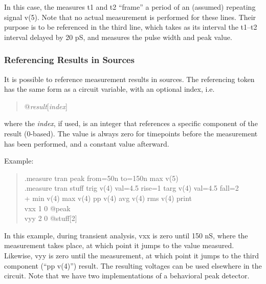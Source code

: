 In this case, the measures {\vt t1} and {\vt t2} ``frame'' a period
of an (assumed) repeating signal v(5).  Note that no actual
measurement is performed for these lines.  Their purpose is to be
referenced in the third line, which takes as its interval the {\vt
t1}--{\vt t2} interval delayed by 20 pS, and measures the pulse
width and peak value.

\subsubsection{Referencing Results in Sources}

It is possible to reference measurement results in sources.  The
referencing token has the same form as a circuit variable, with an
optional index, i.e.
\begin{quote}\vt
    @{\it result\/}[{\it index\/}]
\end{quote}
where the {\it index\/}, if used, is an integer that references a
specific component of the result (0-based).  The value is always zero
for timepoints before the measurement has been performed, and a
constant value afterward.

Example:
\begin{quote}\vt
    .measure tran peak from=50n to=150n max v(5)\\
    .measure tran stuff trig v(4) val=4.5 rise=1 targ v(4) val=4.5 fall=2\\
    + min v(4) max v(4) pp v(4) avg v(4) rms v(4) print\\
    vxx 1 0 @peak\\
    vyy 2 0 @stuff[2]\\
\end{quote}

In this example, during transient analysis, {\vt vxx} is zero until
150 nS, where the measurement takes place, at which point it jumps to
the value measured.  Likewise, {\vt vyy} is zero until the
measurement, at which point it jumps to the third component (``{\vt pp
v(4)}'') result.  The resulting voltages can be used elsewhere in the
circuit.  Note that we have two implementations of a behavioral peak
detector.


\subsection{}


